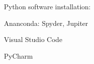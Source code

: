 \documentclass[main.tex]{subfiles}
\begin{document}
Python software installation:

Ananconda: Spyder, Jupiter

Visual Studio Code

PyCharm

\newpage
\end{document}

